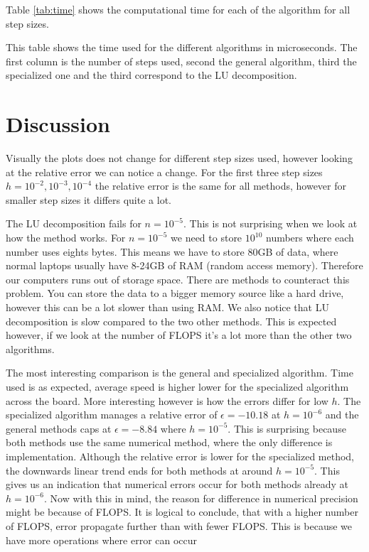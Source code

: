 \documentclass[reprint, english,notitlepage]{revtex4-1}  %
\begin{document}
Table \ref{tab:time} shows the computational time for each of the algorithm for all step sizes.

\begin{table}  %
  
  \caption{This table shows the time used for the different algorithms in microseconds. The first column is the number of steps used, second the general algorithm, third the specialized one and the third correspond to the LU decomposition.}
	\label{tab:time}
\end{table}



\section{Discussion}

Visually the plots does not change for different step sizes used, however looking at the relative error we can notice a change. For the first three step sizes $h = 10^{-2}, 10^{-3}, 10^{-4}$ the relative error is the same for all methods, however for smaller step sizes it differs quite a lot.

The LU decomposition fails for $n=10^{-5}$. This is not surprising when we look at how the method works. For $n=10^{-5}$ we need to store $10^10$ numbers where each number uses eights bytes. This means we have to store 80GB of data, where normal laptops usually have 8-24GB of RAM (random access memory). Therefore our computers runs out of storage space. There are methods to counteract this problem. You can store the data to a bigger memory source like a hard drive, however this can be a lot slower than using RAM. We also notice that LU decomposition is slow compared to the two other methods. This is expected however, if we look at the number of FLOPS it's a lot more than the other two algorithms.

The most interesting comparison is the general and specialized algorithm. Time used is as expected, average speed is higher lower for the specialized algorithm across the board. More interesting however is how the errors differ for low $h$. The specialized algorithm manages a relative error of $\epsilon = -10.18$ at $h=10^{-6}$ and the general methods caps at $\epsilon = -8.84$ where $h = 10^{-5}$. This is surprising because both methods use the same numerical method, where the only difference is implementation. Although the relative error is lower for the specialized method, the downwards linear trend ends for both methods at around $h=10^{-5}$. This gives us an indication that numerical errors occur for both methods already at $h=10^{-6}$. Now with this in mind, the reason for difference in numerical precision might be because of FLOPS. It is logical to conclude, that with a higher number of FLOPS, error propagate further than with fewer FLOPS. This is because we have more operations where error can occur 
\end{document}
